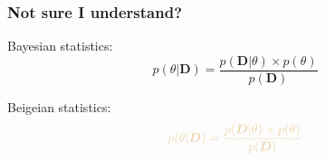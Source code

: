 \documentclass[handout]{beamer}
\begin{document}
\begin{frame}
	\frametitle{Not sure I understand?}
	
	 Bayesian statistics:{
		\begin{equation}
		p(\theta|\boldsymbol{D}) = \frac{p(\boldsymbol{D}|\theta)\times p(\theta)}{p(\boldsymbol{D})}
		\end{equation}}
	
	 Beigeian statistics:{
		\begin{equation}
		\textcolor{beige}{p(\theta|\boldsymbol{D}) = \frac{p(\boldsymbol{D}|\theta)\times p(\theta)}{p(\boldsymbol{D})}}
		\end{equation}}
	
\end{frame}
\end{document}
